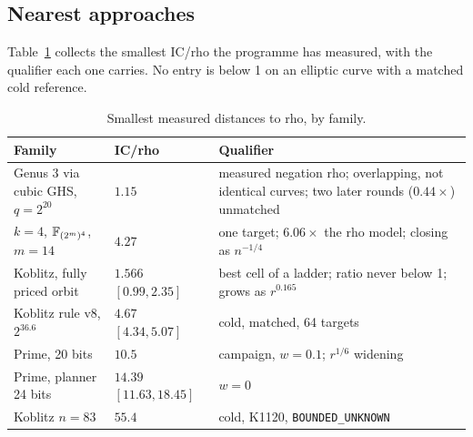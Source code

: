 \subsection{Nearest approaches}

Table~\ref{tab:nearest} collects the smallest IC/rho the programme has
measured, with the qualifier each one carries. No entry is below 1 on an
elliptic curve with a matched cold reference.

\begin{table}[t]
\centering\small
\caption[]{Smallest measured distances to rho, by family.}
\label{tab:nearest}
\begin{tabularx}{\linewidth}{@{}>{\raggedright}p{3.6cm}l>{\raggedright\arraybackslash}X@{}}
\toprule
Family & IC/rho & Qualifier \\
\midrule
Genus 3 via cubic GHS, $q=2^{20}$ & $1.15$ & measured negation rho; overlapping, not identical curves; two later rounds ($0.44\times$) unmatched \\
$k=4$, $\mathbb{F}_{(2^m)^4}$, $m=14$ & $4.27$ & one target; $6.06\times$ the rho model; closing as $n^{-1/4}$ \\
Koblitz, fully priced orbit & $1.566$ $[0.99,2.35]$ & best cell of a ladder; ratio never below 1; grows as $r^{0.165}$ \\
Koblitz rule v8, $2^{36.6}$ & $4.67$ $[4.34,5.07]$ & cold, matched, 64 targets \\
Prime, 20 bits & $10.5$ & campaign, $w=0.1$; $r^{1/6}$ widening \\
Prime, planner 24 bits & $14.39$ $[11.63,18.45]$ & $w=0$ \\
Koblitz $n=83$ & $55.4$ & cold, K1120, \texttt{BOUNDED\_UNKNOWN} \\
\bottomrule
\end{tabularx}
\end{table}
